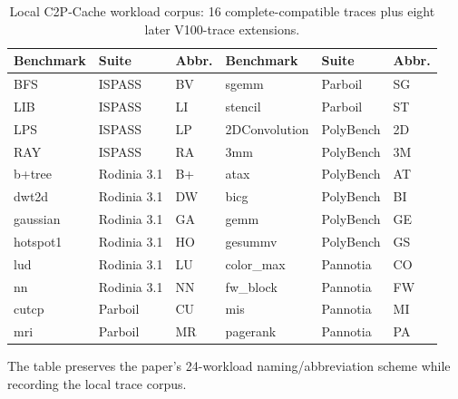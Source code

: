 \documentclass[10pt]{article}
\begin{document}
\begin{table}[ht]
\centering
\caption{Local C2P-Cache workload corpus: 16 complete-compatible traces plus eight later V100-trace extensions.}
\label{tab:c2p-local-workloads}
\small
\begin{tabular}{@{}lll|lll@{}}
\toprule
\textbf{Benchmark} & \textbf{Suite} & \textbf{Abbr.} & \textbf{Benchmark} & \textbf{Suite} & \textbf{Abbr.} \\
\midrule
BFS & ISPASS & BV & sgemm & Parboil & SG \\
LIB & ISPASS & LI & stencil & Parboil & ST \\
LPS & ISPASS & LP & 2DConvolution & PolyBench & 2D \\
RAY & ISPASS & RA & 3mm & PolyBench & 3M \\
b+tree & Rodinia 3.1 & B+ & atax & PolyBench & AT \\
dwt2d & Rodinia 3.1 & DW & bicg & PolyBench & BI \\
gaussian & Rodinia 3.1 & GA & gemm & PolyBench & GE \\
hotspot1 & Rodinia 3.1 & HO & gesummv & PolyBench & GS \\
lud & Rodinia 3.1 & LU & color\_max & Pannotia & CO \\
nn & Rodinia 3.1 & NN & fw\_block & Pannotia & FW \\
cutcp & Parboil & CU & mis & Pannotia & MI \\
mri & Parboil & MR & pagerank & Pannotia & PA \\
\bottomrule
\end{tabular}
\par\medskip
\footnotesize The table preserves the paper's 24-workload naming/abbreviation scheme while recording the local trace corpus.
\end{table}
\end{document}
